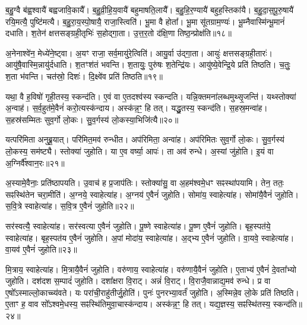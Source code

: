 ब॒हु॒ग्वै ब॑ह्व॒श्वायै॑ बह्वजावि॒कायै᳚।
ब॒हु॒व्री॒हि॒य॒वायै॑ बहुमाष\-ति॒लायै᳚।
ब॒हु॒हि॒र॒ण्यायै॑ बहुह॒स्तिका॑यै।
ब॒हु॒दा॒स॒\-पू॒रु॒षायै॑ रयि॒मत्यै॒ पुष्टि॑मत्यै।
ब॒हु॒रा॒य॒स्पो॒षायै॒ राजा॒स्त्विति॑।
भू॒मा वै होता᳚।
भू॒मा सू॑तग्राम॒ण्यः॑।
भू॒म्नैवास्मि॑न्भू॒मानं॑ दधाति।
श॒तेन॑ क्षत्तसङ्ग्रही॒तृभिः॑ स॒होद्गा॒ता।
उ॒त्त॒र॒तो द॑क्षि॒णा तिष्ठ॒न्प्रोक्ष॑ति॥१८॥

अ॒नेनाश्वे॑न॒ मेध्ये॑ने॒ष्ट्वा।
अ॒यꣳ राजा॒ सर्व॒मायु॑रे॒त्विति॑।
आयु॒र्वा उ॑द्गा॒ता।
आयुः॑ क्षत्तसङ्ग्रही॒तारः॑।
आयु॑षै॒वास्मि॒न्नायु॑र्द\-धाति।
श॒तꣳ\-श॑तं भवन्ति।
श॒तायुः॒ पुरु॑षः श॒तेन्द्रि॑यः।
आयु॑ष्ये॒वेन्द्रि॒ये प्रति॑ तिष्ठति।
च॒तुः॒ श॒ता भ॑वन्ति।
चत॑स्रो॒ दिशः॑।
दि॒क्ष्वे॑व प्रति॑ तिष्ठति॥१९॥\anuvakamend[ब्र॒ह्मा वि॒श उ॑क्षति॒ दिश॒ एकं॑ च]

यथा॒ वै ह॒विषो॑ गृही॒तस्य॒ स्कन्द॑ति।
ए॒वं वा ए॒तदश्व॑स्य स्कन्दति।
यन्नि॒क्तमना॑लब्धमुथ्सृ॒जन्ति॑।
यथ्स्तोक्या॑ अ॒न्वाह॑।
स॒र्व॒हुत॑मे॒वैनं॑ करो॒त्यस्क॑न्दाय।
अस्क॑न्न॒ꣳ॒ हि तत्।
यद्धु॒तस्य॒ स्कन्द॑ति।
स॒हस्र॒मन्वा॑ह।
स॒हस्र॑सम्मितः सुव॒र्गो लो॒कः।
सु॒व॒र्गस्य॑ लो॒कस्या॒भिजि॑त्यै॥२०॥

यत्परि॑मिता अनुब्रू॒यात्।
परि॑मित॒मव॑ रुन्धीत।
अप॑रिमिता॒ अन्वा॑ह।
अप॑रिमितः सुव॒र्गो लो॒कः।
सु॒व॒र्गस्य॑ लो॒कस्य॒ सम॑ष्ट्यै।
स्तोक्या॑ जुहोति।
या ए॒व वर्ष्या॒ आपः॑।
ता अव॑ रुन्धे।
अ॒स्यां जु॑होति।
इ॒यं वा अ॒ग्निर्वै᳚श्वान॒रः॥२१॥

अ॒स्यामे॒वैनाः॒ प्रति॑\-ष्ठापयति।
उ॒वाच॑ ह प्र॒जा\-प॑तिः।
स्तोक्या॑सु॒ वा अ॒हम॑श्वमे॒धꣳ सꣴस्था॑पयामि।
तेन॒ ततः॒ सꣴस्थि॑तेन चरा॒मीति॑।
अ॒ग्नये॒ स्वाहेत्या॑ह।
अ॒ग्नय॑ ए॒वैनं॑ जुहोति।
सोमा॑य॒ स्वाहेत्या॑ह।
सोमा॑यै॒वैनं॑ जुहोति।
स॒वि॒त्रे स्वाहेत्या॑ह।
स॒वि॒त्र ए॒वैनं॑ जुहोति॥२२॥

सर॑स्वत्यै॒ स्वाहेत्या॑ह।
सर॑स्वत्या ए॒वैनं॑ जुहोति।
पू॒ष्णे स्वाहेत्या॑ह।
पू॒ष्ण ए॒वैनं॑ जुहोति।
बृह॒स्पत॑ये॒ स्वाहेत्या॑ह।
बृह॒स्पत॑य ए॒वैनं॑ जुहोति।
अ॒पां मोदा॑य॒ स्वाहेत्या॑ह।
अ॒द्भ्य ए॒वैनं॑ जुहोति।
वा॒यवे॒ स्वाहेत्या॑ह।
वा॒यव॑ ए॒वैनं॑ जुहोति॥२३॥

मि॒त्राय॒ स्वाहेत्या॑ह।
मि॒त्रायै॒वैनं॑ जुहोति।
वरु॑णाय॒ स्वाहेत्या॑ह।
वरु॑णायै॒वैनं॑ जुहोति।
ए॒ताभ्य॑ ए॒वैनं॑ दे॒वता᳚भ्यो जुहोति।
दश॑दश स॒म्पादं॑ जुहोति।
दशा᳚क्षरा वि॒राट्।
अन्नं॑ वि॒राट्।
वि॒राजै॒वान्नाद्य॒मव॑ रुन्धे।
प्र वा ए॒षो᳚\-ऽस्माल्लो॒काच्च्य॑वते।
यः परा॑ची॒राहु॑तीर्जु॒होति॑।
पुनः॑ पुनरभ्या॒वर्तं॑ जुहोति।
अ॒स्मिन्ने॒व लो॒के प्रति॑ तिष्ठति।
ए॒ताꣳ ह॒ वाव सो᳚\-ऽश्वमे॒धस्य॒ सꣴस्थि॑तिमुवा॒चास्क॑न्दाय।
अस्क॑न्न॒ꣳ॒ हि तत्।
यद्य॒ज्ञस्य॒ सꣴस्थि॑तस्य॒ स्कन्द॑ति॥२४॥\anuvakamend[अ॒भिजि॑त्यै वैश्वान॒रः स॑वि॒त्र ए॒वैनं॑ जुहोति वा॒यव॑ ए॒वैनं॑ जुहोति च्यवते॒ षट् च॑]


